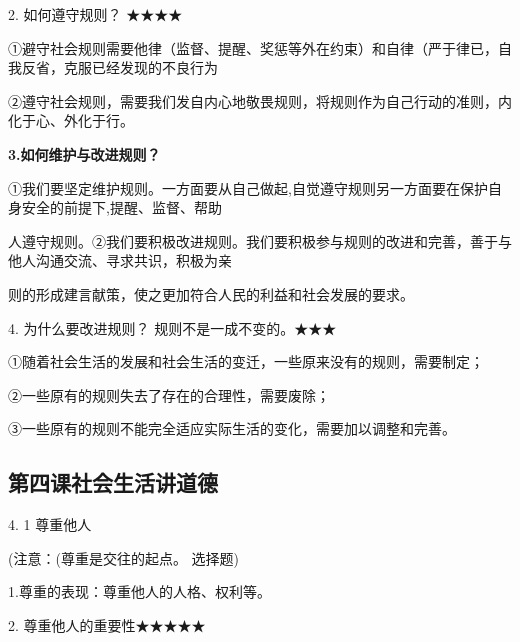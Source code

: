 \documentclass[lang=cn,11pt]{elegantbook}
\newcommand{\daofasym}[1]{{\daofasymbolfont #1}}
\newcommand{\daofasym}[1]{#1}
\begin{document}
2. 如何遵守规则？ \daofasym{★}\daofasym{★}\daofasym{★}\daofasym{★}\par

\daofasym{①}避守社会规则需要他律（监督、提醒、奖惩等外在约束）和自律（严于律已，自我反省，克服已经发现的不良行为\par

\daofasym{②}遵守社会规则，需要我们发自内心地敬畏规则，将规则作为自己行动的准则，内化于心、外化于行。\par

\textbf{3.如何维护与改进规则？}\par

\daofasym{①}我们要坚定维护规则。一方面要从自己做起,自觉遵守规则另一方面要在保护自身安全的前提下,提醒、监督、帮助\par

人遵守规则。\daofasym{②}我们要积极改进规则。我们要积极参与规则的改进和完善，善于与他人沟通交流、寻求共识，积极为亲\par

则的形成建言献策，使之更加符合人民的利益和社会发展的要求。\par

4. 为什么要改进规则？ 规则不是一成不变的。\daofasym{★}\daofasym{★}\daofasym{★}\par

\daofasym{①}随着社会生活的发展和社会生活的变迁，一些原来没有的规则，需要制定；\par

\daofasym{②}一些原有的规则失去了存在的合理性，需要废除；\par

\daofasym{③}一些原有的规则不能完全适应实际生活的变化，需要加以调整和完善。\par

\subsection*{第四课社会生活讲道德}

4. 1 尊重他人\par

(注意：(尊重是交往的起点。 选择题)\par

1.尊重的表现：尊重他人的人格、权利等。\par

2. 尊重他人的重要性\daofasym{★}\daofasym{★}\daofasym{★}\daofasym{★}\daofasym{★}\par
\end{document}

